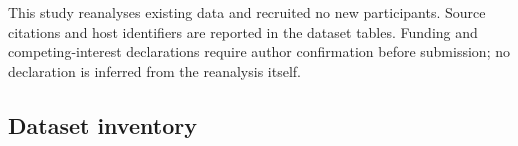 This study reanalyses existing data and recruited no new participants.
Source citations and host identifiers are reported in the dataset tables.
Funding and competing-interest declarations require author confirmation
before submission; no declaration is inferred from the reanalysis itself.

\clearpage
\onecolumn
\unsetvruler
\begin{landscape}
\section*{Dataset inventory}

\end{landscape}
\clearpage
\twocolumn
\linenoon

